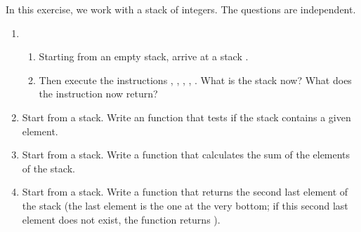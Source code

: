 \documentclass[11pt,class=report,crop=false]{standalone}
\begin{document}
\begin{activite}


In this exercise, we work with a stack of integers. The questions are independent.

\begin{enumerate}
  \item 
  \begin{enumerate}
    \item Starting from an empty stack, arrive at a stack \ci{[5,7,2,4]}.
    \item Then execute the instructions , , , , . What is the stack now? What does the instruction   now return?
\end{enumerate}  

  \item Start from a stack. Write an  function that tests if the stack contains a given element.
  
  \item Start from a stack. Write a function that calculates the sum of the elements of the stack. 
  
  \item Start from a stack. Write a function that returns the second last element of the stack (the last element is the one at the very bottom; if this second last element does not exist, the function returns ). 
  
\end{enumerate} 
\end{activite}

\end{document}
